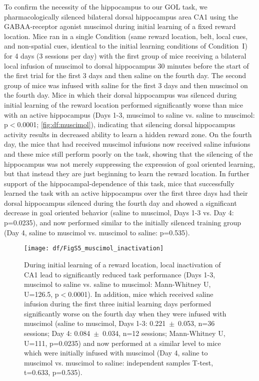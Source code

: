 To confirm the necessity of the hippocampus to our GOL task, we pharmacologically silenced bilateral dorsal hippocampus area CA1 using the GABAA-receptor agonist muscimol during initial learning of a fixed reward location. Mice ran in a single Condition (same reward location, belt, local cues, and non-spatial cues, identical to the initial learning conditions of Condition~I) for 4 days (3 sessions per day) with the first group of mice receiving a bilateral local infusion of muscimol to dorsal hippocampus 30 minutes before the start of the first trial for the first 3 days and then saline on the fourth day. The second group of mice was infused with saline for the first 3 days and then muscimol on the fourth day. Mice in which their dorsal hippocampus was silenced during initial learning of the reward location performed significantly worse than mice with an active hippocampus (Days 1-3, muscimol to saline vs. saline to muscimol: p$<$0.0001; \autoref{fig:df:muscimol}), indicating that silencing dorsal hippocampus activity results in decreased ability to learn a hidden reward zone. On the fourth day, the mice that had received muscimol infusions now received saline infusions and these mice still perform poorly on the task, showing that the silencing of the hippocampus was not merely suppressing the expression of goal oriented learning, but that instead they are just beginning to learn the reward location. In further support of the hippocampal-dependence of this task, mice that successfully learned the task with an active hippocampus over the first three days had their dorsal hippocampus silenced during the fourth day and showed a significant decrease in goal oriented behavior (saline to muscimol, Days 1-3 vs. Day 4: p=0.0235), and now performed similar to the initially silenced training group (Day 4, saline to muscimol vs. muscimol to saline: p=0.535).

\begin{figure}
	\centering
	\texttt{[image: df/FigS5\_muscimol\_inactivation]}
	\caption[Impaired task performance during CA1 inactivation]{During initial learning of a reward location, local inactivation of CA1 lead to significantly reduced task performance (Days 1-3, muscimol to saline vs. saline to muscimol: Mann-Whitney U, U=126.5, p$<$0.0001). In addition, mice which received saline infusion during the first three initial learning days performed significantly worse on the fourth day when they were infused with muscimol (saline to muscimol, Days 1-3: 0.221~$\pm$~0.053, n=36 sessions; Day 4: 0.084~$\pm$~0.034, n=12 sessions; Mann-Whitney U, U=111, p=0.0235) and now performed at a similar level to mice which were initially infused with muscimol (Day 4, saline to muscimol vs. muscimol to saline: independent samples T-test, t=0.633, p=0.535).}
	\label{fig:df:muscimol}
\end{figure}

